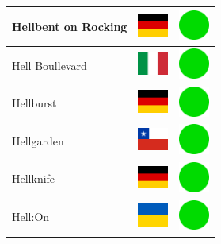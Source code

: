 \documentclass[12pt, a4paper, twoside]{report}
\begin{document}
\begin{center}
\begin{longtable}{|p{5cm}|p{2cm}|p{2cm}|}
Hellbent on Rocking & \includegraphics[width=1cm]{4x3/de} & \includegraphics[width=1cm]{likes/y} \\ \hline
Hell Boullevard & \includegraphics[width=1cm]{4x3/it} & \includegraphics[width=1cm]{likes/y} \\ \hline
Hellburst & \includegraphics[width=1cm]{4x3/de} & \includegraphics[width=1cm]{likes/y} \\ \hline
Hellgarden & \includegraphics[width=1cm]{4x3/cl} & \includegraphics[width=1cm]{likes/y} \\ \hline
Hellknife & \includegraphics[width=1cm]{4x3/de} & \includegraphics[width=1cm]{likes/y} \\ \hline
Hell:On & \includegraphics[width=1cm]{4x3/ua} & \includegraphics[width=1cm]{likes/y} \\ \hline

\end{longtable}
\end{center}
\end{document}
